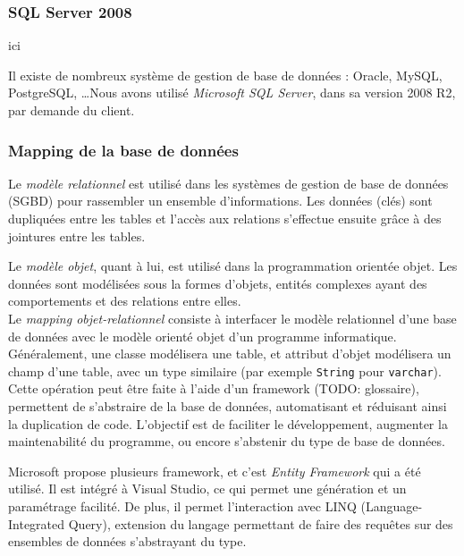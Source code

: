 
\subsubsection{SQL Server 2008}
ici

Il existe de nombreux système de gestion de base de données : Oracle, MySQL, PostgreSQL, \ldots Nous avons utilisé \textit{Microsoft SQL Server}, dans sa version 2008 R2, par demande du client.


\subsubsection{Mapping de la base de données}

Le \textit{modèle relationnel} est utilisé dans les systèmes de gestion de base de données (SGBD) pour rassembler un ensemble d'informations. Les données (clés) sont dupliquées entre les tables et l'accès aux relations s'effectue ensuite grâce à des jointures entre les tables.

Le \textit{modèle objet}, quant à lui, est utilisé dans la programmation orientée objet. Les données sont modélisées sous la formes d'objets, entités complexes ayant des comportements et des relations entre elles.
\\

Le \textit{mapping objet-relationnel} consiste à interfacer le modèle relationnel d'une base de données avec le modèle orienté objet d'un programme informatique. Généralement, une classe modélisera une table, et attribut d'objet modélisera un champ d'une table, avec un type similaire (par exemple \lstinline{String} pour \lstinline{varchar}).
\\

Cette opération peut être faite à l'aide d'un framework (TODO: glossaire), permettent de s'abstraire de la base de données, automatisant et réduisant ainsi la duplication de code. L'objectif est de faciliter le développement, augmenter la maintenabilité du programme, ou encore s'abstenir du type de base de données.

Microsoft propose plusieurs framework, et c'est \textit{Entity Framework} qui a été utilisé. Il est intégré à Visual Studio, ce qui permet une génération et un paramétrage facilité. De plus, il permet l'interaction avec  LINQ (Language-Integrated Query), extension du langage permettant de faire des requêtes sur des ensembles de données s'abstrayant du type.

